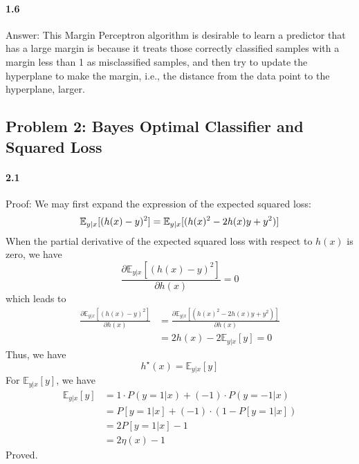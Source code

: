\documentclass[11pt]{article}
\begin{document}
\paragraph{1.6}
Answer:
\newline
This Margin Perceptron algorithm is desirable to learn a predictor that has a large margin is because 
it treats those correctly classified samples with a margin less than 1 as misclassified samples, and then 
try to update the hyperplane to make the margin, i.e., the distance from the data point to the hyperplane, larger.

\subsection*{\Large Problem 2: Bayes Optimal Classifier and Squared Loss}

\paragraph{2.1}
Proof: 
\newline
We may first expand the expression of the expected squared loss:
\begin{equation}
    \mathbb{E}_{y|x}[(h(x)-y)^2] = \mathbb{E}_{y|x}[(h(x)^2 - 2h(x)y + y^2)] \\
\end{equation}
When the partial derivative of the expected squared loss with respect to $h(x)$ is zero, we have
\begin{equation}
    \frac{\partial \mathbb{E}_{y|x}[(h(x)-y)^2]}{\partial h(x)} = 0
\end{equation}
which leads to 
\begin{equation}
    \begin{split}
        \frac{\partial \mathbb{E}_{y|x}[(h(x)-y)^2]}{\partial h(x)} &= \frac{\partial \mathbb{E}_{y|x}[(h(x)^2 - 2h(x)y + y^2)]}{\partial h(x)} \\
        &= 2h(x) - 2\mathbb{E}_{y|x}[y] = 0
    \end{split}
\end{equation}
Thus, we have
\begin{equation}
    h^\star(x) = \mathbb{E}_{y|x}[y]
\end{equation}
For $\mathbb{E}_{y|x}[y]$, we have
\begin{equation}
  \begin{split}
    \mathbb{E}_{y|x}[y] &= 1 \cdot P(y=1|x) + (-1) \cdot P(y=-1|x) \\
    &= P[y=1|x] + (-1) \cdot (1 - P[y=1|x]) \\
    &= 2P[y=1|x] - 1 \\
    &= 2\eta(x)-1
  \end{split}
\end{equation}
Proved.
\end{document}
